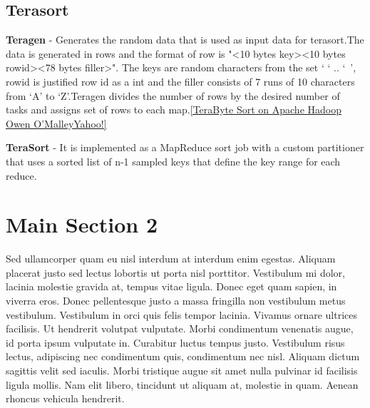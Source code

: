 
\subsection{Terasort}

\textbf{Teragen} - Generates the random data that is used as input data for terasort.The data is generated in rows and the format of 
row is "<10 bytes key><10 bytes rowid><78 bytes filler>". 
The keys are random characters from the set ‘ ‘ .. ‘~’, rowid is justified row id as a int and the filler consists of 7 runs of 10 characters from ‘A’ to ‘Z’.Teragen divides the number of rows by the desired number of tasks and assigns set of rows to each map.\ref{TeraByte Sort on Apache Hadoop Owen O’MalleyYahoo!}


\textbf{TeraSort} - It is implemented as a MapReduce sort job with a custom partitioner that uses a sorted list of n-1 sampled keys that define the key range for each reduce.



\section{Main Section 2}

Sed ullamcorper quam eu nisl interdum at interdum enim egestas. Aliquam placerat justo sed lectus lobortis ut porta nisl porttitor. Vestibulum mi dolor, lacinia molestie gravida at, tempus vitae ligula. Donec eget quam sapien, in viverra eros. Donec pellentesque justo a massa fringilla non vestibulum metus vestibulum. Vestibulum in orci quis felis tempor lacinia. Vivamus ornare ultrices facilisis. Ut hendrerit volutpat vulputate. Morbi condimentum venenatis augue, id porta ipsum vulputate in. Curabitur luctus tempus justo. Vestibulum risus lectus, adipiscing nec condimentum quis, condimentum nec nisl. Aliquam dictum sagittis velit sed iaculis. Morbi tristique augue sit amet nulla pulvinar id facilisis ligula mollis. Nam elit libero, tincidunt ut aliquam at, molestie in quam. Aenean rhoncus vehicula hendrerit.